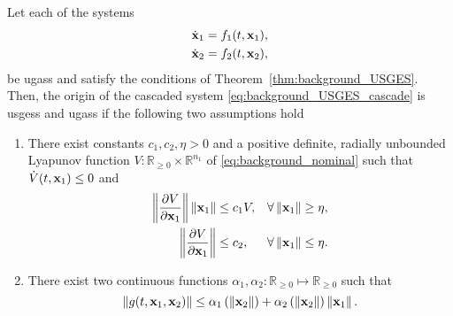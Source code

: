 \begin{prop}
    Let each of the systems
    \begin{align}
        \dot{\mathbf{x}}_1 &= f_1(t, \mathbf{x}_1), \label{eq:background_nominal} \\
        \dot{\mathbf{x}}_2 &= f_2(t, \mathbf{x}_2), 
    \end{align}
    be \glspl{ugas} and satisfy the conditions of Theorem~\ref{thm:background_USGES}.
    Then, the origin of the cascaded system \eqref{eq:background_USGES_cascade} is \glspl{usges} and \glspl{ugas} if the following two assumptions hold
    \begin{enumerate}
        \item There exist constants $c_1, c_2, \eta > 0$ and a positive definite, radially unbounded Lyapunov function $V : \mathbb{R}_{\geq 0} \times \mathbb{R}^{n_1}$ of \eqref{eq:background_nominal} such that $\dot{V}(t, \mathbf{x}_1) \leq 0$ and
        \begin{subequations}
            \begin{align}
                \left\|\frac{\partial V}{\partial \mathbf{x}_1}\right\| \left\|\mathbf{x}_1\right\| &\leq c_1 V,& \forall&\left\|\mathbf{x}_1\right\| \geq \eta, \\
                \left\|\frac{\partial V}{\partial \mathbf{x}_1}\right\| &\leq c_2,& \forall&\left\|\mathbf{x}_1\right\| \leq \eta.
            \end{align}
            \label{eq:background_USGES_cascade_assumption_1}
        \end{subequations}
        \item There exist two continuous functions $\alpha_1, \alpha_2: \mathbb{R}_{\geq 0} \mapsto \mathbb{R}_{\geq 0}$ such that
        \begin{equation}
            \left\|g(t, \mathbf{x}_1, \mathbf{x}_2)\right\| \leq \alpha_1 \left(\left\|\mathbf{x}_2\right\|\right) + \alpha_2 \left(\left\|\mathbf{x}_2\right\|\right) \left\|\mathbf{x}_1\right\|.
            \label{eq:background_USGES_cascade_assumption_2}
        \end{equation}
    \end{enumerate}
\end{prop}
